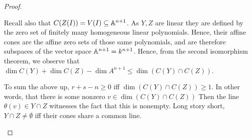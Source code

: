 \begin{proof}
\begin{enumerate}[label=(\alph*)]
        Recall also that $C(Z(I)) = V(I) \subseteq \mathbb A^{n + 1}$. As $Y, Z$ are linear they are defined by the zero set of finitely many homogeneous linear polynomials. Hence, their affine cones are the affine zero sets of those same polynomials, and are therefore subspaces of the vector space $\mathbb A^{n + 1} = k^{n + 1}$. Hence, from the second isomorphism theorem, we observe that $\dim C(Y) + \dim C(Z) - \dim A^{n + 1} \leq \dim (C(Y) \cap C(Z))$.

        To sum the above up, $r + s - n \geq 0$ iff $\dim (C(Y) \cap C(Z)) \geq 1$. In other words, that there is some nonzero $v \in \dim (C(Y) \cap C(Z))$ Then the line $\theta(v) \in Y \cap Z$ witnesses the fact that this is nonempty. Long story short, $Y \cap Z \neq \emptyset$ iff their cones share a common line.
    \end{enumerate}
\end{proof}
